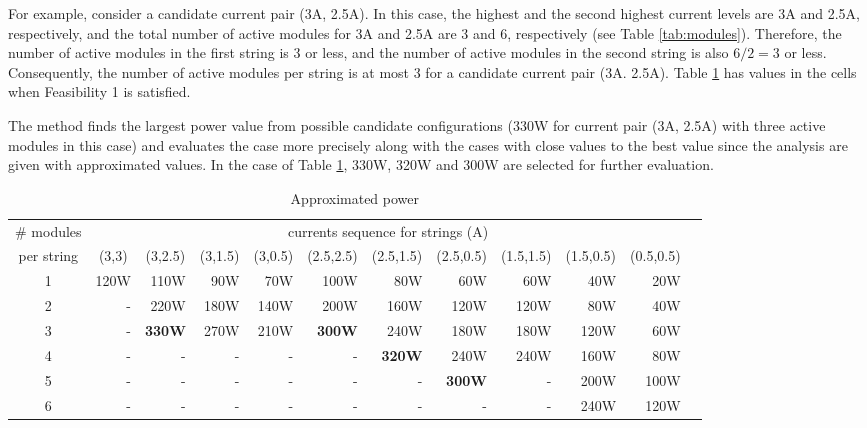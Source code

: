 \documentclass[conference]{pvsctran}
\begin{document}
For example, consider a candidate current pair (3A, 2.5A). In this case, the highest and the second highest current levels are 3A and 2.5A, respectively, and the total number of active modules for 3A and 2.5A are 3 and 6, respectively (see Table \ref{tab:modules}). Therefore, the number of active modules in the first string is 3 or less, and the number of active modules in the second string is also $ 6/2  = 3$ or less. Consequently, the number of active modules per string is at most 3 for a candidate current pair (3A. 2.5A). Table \ref{tab:powers} has values in the cells when Feasibility 1 is satisfied. 

The method finds the largest power value from possible candidate configurations (330W for current pair (3A, 2.5A) with three active modules in this case) and evaluates the case more precisely along with the cases with close values to the best value since the analysis are given with approximated values. In the case of Table \ref{tab:powers}, 330W, 320W and 300W are selected for further evaluation. 


\begin{table}[t]
\caption{Approximated power}
\label{tab:powers}
\centering
\begin{tabular}{c|rrrrrrrrrrr}
\hline\hline	
\# modules & 	\multicolumn{10}{c}{currents sequence for strings (A)} \\ 																
per string		&	\multicolumn{1}{c}{(3,3)}	&	\multicolumn{1}{c}{(3,2.5)}	&	\multicolumn{1}{c}{(3,1.5)}	&	\multicolumn{1}{c}{(3,0.5)}	&	\multicolumn{1}{c}{(2.5,2.5)}	&	\multicolumn{1}{c}{(2.5,1.5)}	&	\multicolumn{1}{c}{(2.5,0.5)}	&	\multicolumn{1}{c}{(1.5,1.5)}	&	\multicolumn{1}{c}{(1.5,0.5)}	&	\multicolumn{1}{c}{(0.5,0.5)}	\\ \hline
	1	&	120W	&	110W	&	90W	&	70W	&	100W	&	80W	&	60W	&	60W	&	40W	&	20W	\\ \hline
	2	&	-	&	220W	&	180W	&	140W	&	200W	&	160W	&	120W	&	120W	&	80W	&	40W	\\ \hline	3	&	-	&\textbf{330W}&	270W	&	210W	&	\textbf{300W}	&	240W	&	180W	&	180W	&	120W	&	60W	\\ \hline
4	&	-	&	-	&	-	&	-	&	-	&	\textbf{320W}	&	240W	&	240W	&	160W	&	80W	\\ \hline
	 5	&	-	&	-	&	-	&	-	&	-	&	-	&	\textbf{300W}	&	-	&	200W	&	100W	\\ \hline
	6	&	-	&	-	&	-	&	-	&	-	&	-	&	-	&	-	&	240W	&	120W	\\ \hline
\end{tabular}
\end{table}
\end{document}
